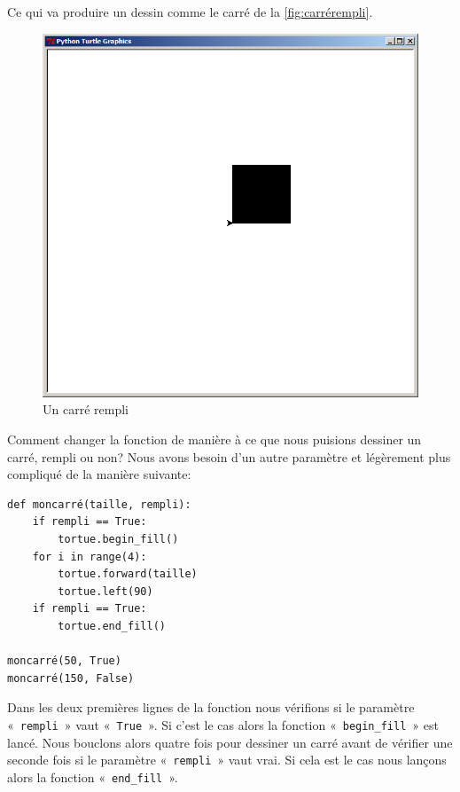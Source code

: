 Ce qui va produire un dessin comme le carré de la \autoref{fig:carrérempli}.
\begin{figure}[h!]
\centering
\includegraphics[scale=0.4]{images/carrerempli}
\caption{Un carré rempli}\label{fig:carrérempli}
\end{figure}

Comment changer la fonction de manière à ce que nous puisions dessiner un carré, rempli ou non? Nous avons besoin d'un autre paramètre et légèrement plus compliqué de la manière suivante:

\begin{Verbatim}[frame=single,rulecolor=\color{mbleu}, label=à taper]
def moncarré(taille, rempli):
    if rempli == True:
        tortue.begin_fill()
    for i in range(4):
        tortue.forward(taille)
        tortue.left(90)
    if rempli == True:
        tortue.end_fill()
        
moncarré(50, True)
moncarré(150, False)
\end{Verbatim}

Dans les deux premières lignes de la fonction nous vérifions si le paramètre « \texttt{rempli} » vaut « \texttt{True} ». Si c'est le cas alors la fonction « \texttt{begin\_fill} »  est lancé. Nous bouclons alors quatre fois pour dessiner un carré avant de vérifier une seconde fois si le paramètre « \texttt{rempli} » vaut vrai.
Si cela est le cas nous lançons alors la fonction « \texttt{end\_fill} ».

